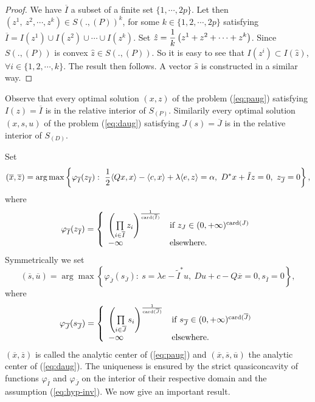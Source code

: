 \begin{proof}
We have ${\overline I}$ a subset of a finite set $\{1,\cdots,2p\}$. Let then $(z^1,\ z^2,\cdots,z^k)\in S(.,(P))^k$, for some $k\in\{1,2,\cdots,2p\}$
satisfying ${\overline I}=I\left(z^1\right)\cup I\left(z^2\right)\cup\cdots\cup I\left(z^k\right)$. Set ${\hat z}=\displaystyle{1\over k}\left(z^1+z^2+\cdots+z^k\right)$. Since $S(.,(P))$ is convex  ${\hat z}\in S(.,(P))$. So it is easy to see that $I(z^i)\subset I({\hat z})$, $\forall i\in\{1,2,\cdots,k\}$. The result then follows. A vector $\hat{s}$ is constructed in a similar way.
\end{proof} 
Observe that every optimal solution $(x,z)$ of the problem (\ref{eq:paug}) satisfying $I(z)=\overline{I}$ is in the relative interior of $S_{(P)}$. Similarily every optimal solution $(x,s,u)$ of the problem (\ref{eq:daug}) satisfying $J(s)=\overline{J}$ is in the relative interior of $S_{(D)}$.

\bigskip

Set 
$$({\overline x},{\overline z})=\arg\max\left\{\varphi_{\overline I}(z_{\overline I}):\ \displaystyle{1\over 2}\langle Qx,x\rangle-\langle c,x\rangle+\lambda\langle e,z\rangle=\alpha,\ D^*x+{\tilde I}z=0,\ z_{\overline{J}}=0\right\},$$
where 
$$\varphi_{\overline I}(z_{\overline I})=\left\{\begin{array}{ll}
\left(\prod\limits_{i\in {\overline I}}z_i\right)^{1\over \operatorname{card}({\overline I})}&\mbox{if }z_J\in(0,+\infty)^{\operatorname{card}(J)}\cr
-\infty&\mbox{elsewhere.}
\end{array}\right.
$$
Symmetrically we set
$$({\overline s},{\overline u})=\arg\max\left\{\varphi_{\overline J}(s_{\overline J}):\ 
s=\lambda e-\tilde{I}^*u,\ D u+c-Q{\overline x}=0, s_{\overline I}=0\right\},$$
where
$$\varphi_{\overline{J}}(s_{\overline{J}})=\left\{\begin{array}{ll}\left(\prod\limits_{i\in \overline{J}}s_i\right)^{1\over \operatorname{card}(\overline{J})}&\mbox{if }s_{\overline{J}}\in(0,+\infty)^{\operatorname{card}(\overline{J})}\cr-\infty&\mbox{elsewhere.}\end{array}\right.
$$
$(\overline{x},\overline{z})$ is called the analytic center\footnotemark[1] of (\ref{eq:paug}) and $(\overline{x},\overline{s},\overline{u})$ the analytic center of (\ref{eq:daug}). The uniqueness is ensured by the strict quasiconcavity of functions $\varphi_{\overline{I}}$ and  $\varphi_{\overline{J}}$ on the interior of their respective domain and the assumption (\ref{eq:hyp-inv}). We now give an important result. 



